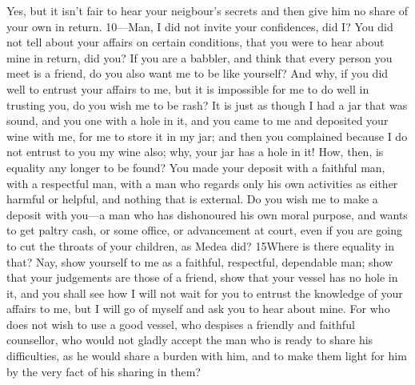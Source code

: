 Yes, but it isn't fair to hear your neigbour's secrets and then give him no share of your own in return. 10—Man, I did not invite your confidences, did I? You did not tell about your affairs on certain conditions, that you were to hear about mine in return, did you? If you are a babbler, and think that every person you meet is a friend, do you also want me to be like yourself? And why, if you did well to entrust your affairs to me, but it is impossible for me to do well in trusting you, do you wish me to be rash? It is just as though I had a jar that was sound, and you one with a hole in it, and you came to me and deposited your wine with me, for me to store it in my jar; and then you complained because I do not entrust to you my wine also; why, your jar has a hole in it! How, then, is equality any longer to be found? You made your deposit with a faithful man, with a respectful man, with a man who regards only his own activities as either harmful or helpful, and nothing that is external. Do you wish me to make a deposit with you—a man who has dishonoured his own moral purpose, and wants to get paltry cash, or some office, or advancement at court, even if you are going to cut the throats of your children, as Medea did? 15Where is there equality in that? Nay, show yourself to me as a faithful, respectful, dependable man; show that your judgements are those of a friend, show that your vessel has no hole in it, and you shall see how I will not wait for you to entrust the knowledge of your affairs to me, but I will go of myself and ask you to hear about mine. For who does not wish to use a good vessel, who despises a friendly and faithful counsellor, who would not gladly accept the man who is ready to share his difficulties, as he would share a burden with him, and to make them light for him by the very fact of his sharing in them?

